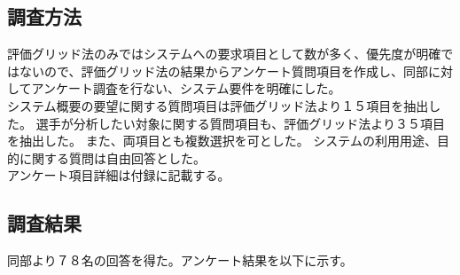 \documentclass[sotsuron]{kuee}
\begin{document}
\subsection{調査方法}
評価グリッド法のみではシステムへの要求項目として数が多く、優先度が明確ではないので、評価グリッド法の結果からアンケート質問項目を作成し、同部に対してアンケート調査を行ない、システム要件を明確にした。
\\システム概要の要望に関する質問項目は評価グリッド法より１５項目を抽出した。
選手が分析したい対象に関する質問項目も、評価グリッド法より３５項目を抽出した。
また、両項目とも複数選択を可とした。
システムの利用用途、目的に関する質問は自由回答とした。
\\アンケート項目詳細は付録に記載する。
\subsection{調査結果}
同部より７８名の回答を得た。アンケート結果を以下に示す。
\end{document}
